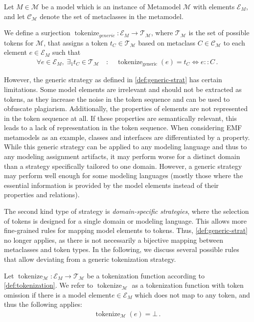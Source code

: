 \begin{theorem}\label{def:generic-strat}
Let \(M \in \mathcal{M}\) be a model which is an instance of Metamodel \(\mathcal{M}\) with elements \(\mathcal{E}_M\), and let \(\mathcal{C}_\mathcal{M}\) denote the set of metaclasses in the metamodel.

We define a surjection \( \operatorname{tokenize}_{generic}: \mathcal{E}_M \rightarrow \mathcal{T}_\mathcal{M} \), where \( \mathcal{T}_\mathcal{M} \) is the set of possible tokens for \(\mathcal{M}\), that assigns a token \(t_C \in \mathcal{T}_\mathcal{M}\) based on metaclass \( C \in \mathcal{C}_\mathcal{M} \) to each element \( e \in \mathcal{E}_M\) such that
\begin{align*}
    \forall e \in \mathcal{E}_M, \; \exists_1 t_C \in \mathcal{T}_\mathcal{M} \quad : \quad 
    \operatorname{tokenize}_{\text{generic}}(e) = t_C \iff e :: C \,.
\end{align*}
\end{theorem}
However, the generic strategy as defined in \autoref{def:generic-strat} has certain limitations. Some model elements are irrelevant and should not be extracted as tokens, as they increase the noise in the token sequence and can be used to obfuscate plagiarism. Additionally, the properties of elements are not represented in the token sequence at all. If these properties are semantically relevant, this leads to a lack of representation in the token sequence. When considering \ac{EMF} metamodels as an example, classes and interfaces are differentiated by a property.
While this generic strategy can be applied to any modeling language and thus to any modeling assignment artifacts, it may perform worse for a distinct domain than a strategy specifically tailored to one domain. However, a generic strategy may perform well enough for some modeling languages (mostly those where the essential information is provided by the model elements instead of their properties and relations). 

The second kind type of strategy is \textit{domain-specific strategies}, where the selection of tokens is designed for a single domain or modeling language.
This allows more fine-grained rules for mapping model elements to tokens. Thus, \autoref{def:generic-strat} no longer applies, as there is not necessarily a bijective mapping between metaclasses and token types. In the following, we discuss several possible rules that allow deviating from a generic tokenization strategy.

\begin{theorem}\label{def:token-omission}
Let \( \operatorname{tokenize}_\mathcal{M}: \mathcal{E}_M \rightarrow \mathcal{T}_\mathcal{M} \) be a tokenization function according to \autoref{def:tokenization}. 
We refer to \( \operatorname{tokenize}_\mathcal{M}\) as a tokenization function with token omission if there is a model element\( e \in \mathcal{E}_M \) which does not map to any token, and thus the following applies:
\begin{align*}
       \operatorname{tokenize}_\mathcal{M}(e) = \bot \,.
\end{align*}
\end{theorem}

